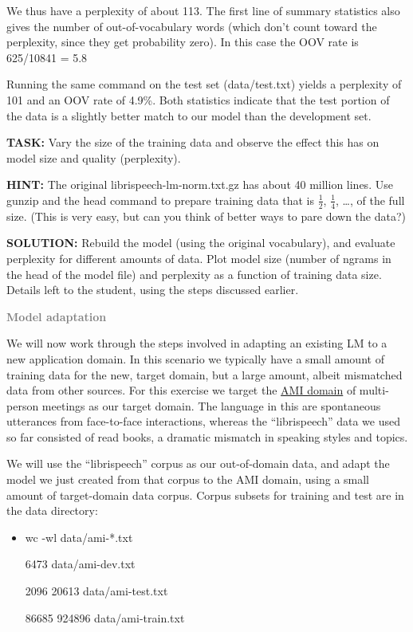 We thus have a perplexity of about 113. The first line of summary statistics also gives the number of out-of-vocabulary words (which don’t count toward the perplexity, since they get probability zero). In this case the OOV rate is 625/10841 = 5.8%

Running the same command on the test set (data/test.txt) yields a perplexity of 101 and an OOV rate of 4.9\%. Both statistics indicate that the test portion of the data is a slightly better match to our model than the development set.

{\bf TASK:} Vary the size of the training data and observe the effect this has on model size and quality (perplexity).

{\bf HINT:} The original librispeech-lm-norm.txt.gz has about 40 million lines. Use gunzip and the head command to prepare training data that is $\frac{1}{2}$, $\frac{1}{4}$, …, of the full size. (This is very easy, but can you think of better ways to pare down the data?)

{\bf SOLUTION:} Rebuild the model (using the original vocabulary), and evaluate perplexity for different amounts of data. Plot model size (number of ngrams in the head of the model file) and perplexity as a function of training data size. Details left to the student, using the steps discussed earlier.

{\bf \textcolor{gray}{Model adaptation}}

We will now work through the steps involved in adapting an existing LM to a new application domain. In this scenario we typically have a small amount of training data for the new, target domain, but a large amount, albeit mismatched data from other sources. For this exercise we target the \href{http://www.amiproject.org/}{AMI domain} of multi-person meetings as our target domain. The language in this are spontaneous utterances from face-to-face interactions, whereas the “librispeech” data we used so far consisted of read books, a dramatic mismatch in speaking styles and topics.

We will use the “librispeech” corpus as our out-of-domain data, and adapt the model we just created from that corpus to the AMI domain, using a small amount of target-domain data corpus. Corpus subsets for training and test are in the data directory:
\begin{itemize}
	\item wc -wl data/ami-*.txt

			6473 data/ami-dev.txt

			2096 20613 data/ami-test.txt

			86685 924896 data/ami-train.txt
\end{itemize}

